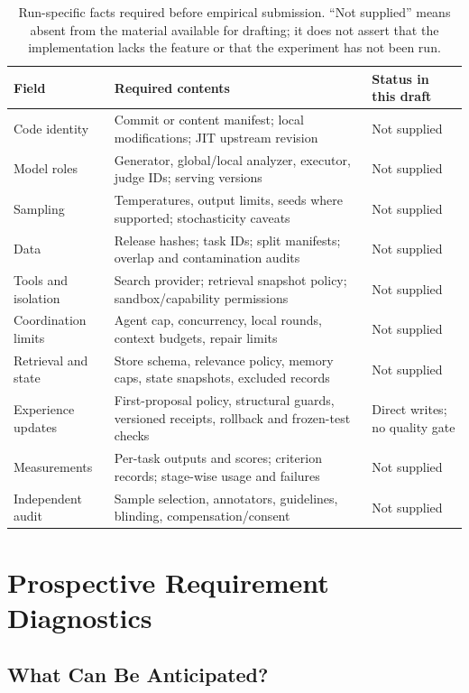 \begin{table}[t]
\centering\small
\begin{tabularx}{\textwidth}{p{3.0cm}XX}
\toprule
Field & Required contents & Status in this draft\\
\midrule
Code identity & Commit or content manifest; local modifications; JIT upstream revision & Not supplied\\
Model roles & Generator, global/local analyzer, executor, judge IDs; serving versions & Not supplied\\
Sampling & Temperatures, output limits, seeds where supported; stochasticity caveats & Not supplied\\
Data & Release hashes; task IDs; split manifests; overlap and contamination audits & Not supplied\\
Tools and isolation & Search provider; retrieval snapshot policy; sandbox/capability permissions & Not supplied\\
Coordination limits & Agent cap, concurrency, local rounds, context budgets, repair limits & Not supplied\\
Retrieval and state & Store schema, relevance policy, memory caps, state snapshots, excluded records & Not supplied\\
Experience updates & First-proposal policy, structural guards, versioned receipts, rollback and frozen-test checks & Direct writes; no quality gate\\
Measurements & Per-task outputs and scores; criterion records; stage-wise usage and failures & Not supplied\\
Independent audit & Sample selection, annotators, guidelines, blinding, compensation/consent & Not supplied\\
\bottomrule
\end{tabularx}
\caption{Run-specific facts required before empirical submission. ``Not supplied'' means absent from the material available for drafting; it does not assert that the implementation lacks the feature or that the experiment has not been run.}
\label{tab:manifest}
\end{table}

\section{Prospective Requirement Diagnostics}
\label{app:prospective}

\subsection{What Can Be Anticipated?}

